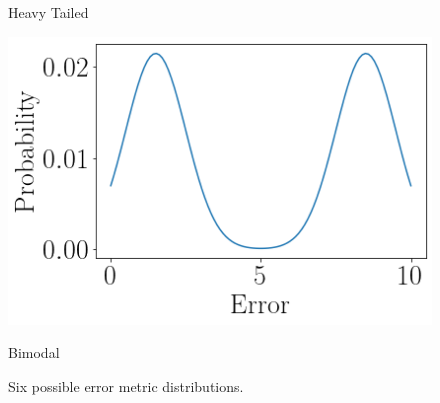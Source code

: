 \begin{figure}[ht]
\begin{minipage}[b]{0.5\linewidth}
    \caption{Heavy Tailed}
    \vspace{4ex}
    \label{heavy_tailed_distributions}
  \end{minipage}%
  \begin{minipage}[b]{0.5\linewidth}
    \centering
    \includegraphics[width=\linewidth]{./img/distributions/twin_peaks.png}
    \caption{Bimodal}
    \label{bimodal_distribution}
    \vspace{4ex}
  \end{minipage}
  \caption{Six possible error metric distributions.}
  \label{fig:error_metric_distributions}
\end{figure}
